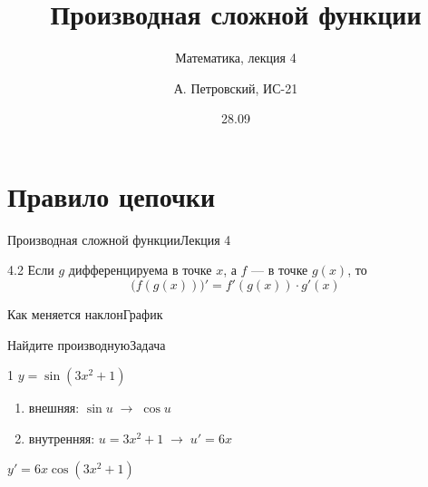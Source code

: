 \documentclass[aspectratio=169]{beamer}
\title{Производная сложной функции}
\subtitle{Математика, лекция 4}
\author{А. Петровский, ИС-21}
\date{28.09}
\begin{document}
\begin{frame}\titlepage\end{frame}

\section{Правило цепочки}

\begin{frame}{Производная сложной функции}{Лекция 4}
\begin{theorem}{4.2}
Если $g$ дифференцируема в точке $x$, а $f$ — в точке $g(x)$, то
\[ \bigl(f(g(x))\bigr)' = f'(g(x))\cdot g'(x) \]
\end{theorem}
\end{frame}

\begin{frame}{Как меняется наклон}{График}
\end{frame}

\begin{frame}{Найдите производную}{Задача}
\begin{task}{1}
$y = \sin(3x^2+1)$
\end{task}
\pause
\begin{enumerate}
\item внешняя: $\sin u \;\to\; \cos u$
\item внутренняя: $u = 3x^2+1 \;\to\; u' = 6x$
\end{enumerate}
\pause
\begin{answerblock}
$y' = 6x\cos(3x^2+1)$
\end{answerblock}
\end{frame}
\end{document}
